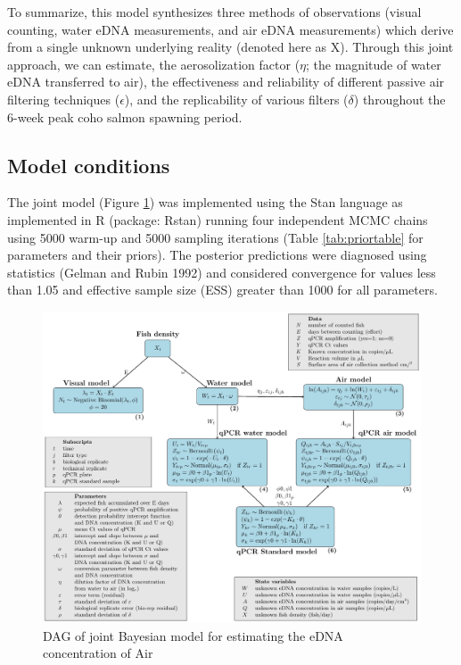 \documentclass{article}
\begin{document}
To summarize, this model synthesizes three methods of observations (visual counting, water eDNA measurements, and air eDNA measurements) which derive from a single unknown underlying reality (denoted here as X). Through this joint approach, we can estimate, the aerosolization factor ($\eta$; the magnitude of water eDNA transferred to air), the effectiveness and reliability of different passive air filtering techniques ($\epsilon$), and the replicability of various filters ($\delta$) throughout the 6-week peak coho salmon spawning period.

\subsection{Model conditions}

The joint model (Figure \ref{fig:DAG}) was implemented using the Stan language as implemented in R (package: Rstan) running four independent MCMC chains using 5000 warm-up and 5000 sampling iterations (Table \ref{tab:priortable} for parameters and their priors). The posterior predictions were diagnosed using statistics (Gelman and Rubin 1992) and considered convergence for values less than 1.05 and effective sample size (ESS) greater than 1000 for all parameters.

\begin{figure}[tbhp] 
\centering
\includegraphics[width=16.5cm]{Plots/DAG.pdf}  
\caption{DAG of joint Bayesian model for estimating the eDNA concentration of Air}
\label{fig:DAG}
\end{figure}
\end{document}
